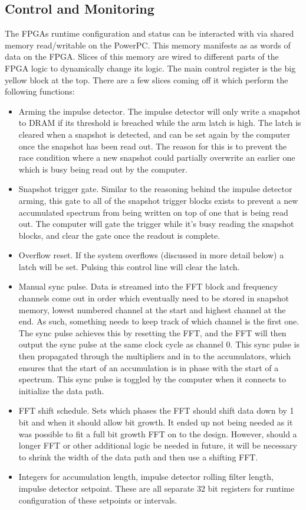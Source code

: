\subsection{Control and Monitoring}
The FPGAs runtime configuration and status can be interacted with via shared memory read/writable on the PowerPC. This memory manifests as as words of data on the FPGA. Slices of this memory are wired to different parts of the FPGA logic to dynamically change its logic. The main control register is the big yellow block at the top. There are a few slices coming off it which perform the following functions: 
\begin{itemize}
  \item Arming the impulse detector. The impulse detector will only write a snapshot to DRAM if its threshold is breached while the arm latch is high. The latch is cleared when a snapshot is detected, and can be set again by the computer once the snapshot has been read out. The reason for this is to prevent the race condition where a new snapshot could partially overwrite an earlier one which is busy being read out by the computer.
  \item Snapshot trigger gate. Similar to the reasoning behind the impulse detector arming, this gate to all of the snapshot trigger blocks exists to prevent a new accumulated spectrum from being written on top of one that is being read out. The computer will gate the trigger while it's busy reading the snapshot blocks, and clear the gate once the readout is complete.
  \item Overflow reset. If the system overflows (discussed in more detail below) a latch will be set. Pulsing this control line will clear the latch.
  \item Manual sync pulse. Data is streamed into the FFT block and frequency channels come out in order which eventually need to be stored in snapshot memory, lowest numbered channel at the start and highest channel at the end. As such, something needs to keep track of which channel is the first one. The sync pulse achieves this by resetting the FFT, and the FFT will then output the sync pulse at the same clock cycle as channel 0. This sync pulse is then propagated through the multipliers and in to the accumulators, which ensures that the start of an accumulation is in phase with the start of a spectrum. This sync pulse is toggled by the computer when it connects to initialize the data path.
  \item FFT shift schedule. Sets which phases the FFT should shift data down by 1 bit and when it should allow bit growth. It ended up not being needed as it was possible to fit a full bit growth FFT on to the design. However, should a longer FFT or other additional logic be needed in future, it will be necessary to shrink the width of the data path and then use a shifting FFT.
  \item Integers for accumulation length, impulse detector rolling filter length, impulse detector setpoint. These are all separate 32 bit registers for runtime configuration of these setpoints or intervals.
\end{itemize}

